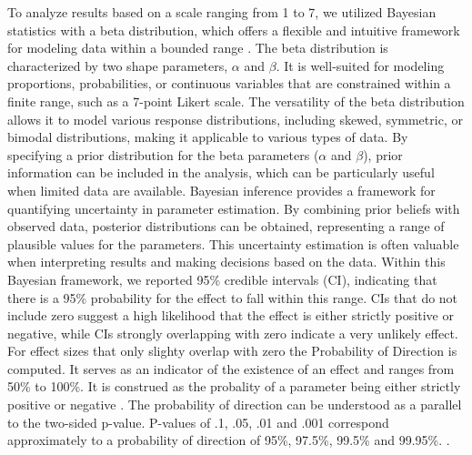 To analyze results based on a scale ranging from 1 to 7, we utilized Bayesian statistics with a beta distribution, which offers a flexible and intuitive framework for modeling data within a bounded range \cite{Paolino2001}. The beta distribution is characterized by two shape parameters, $\alpha$ and $\beta$. It is well-suited for modeling proportions, probabilities, or continuous variables that are constrained within a finite range, such as a 7-point Likert scale. The versatility of the beta distribution allows it to model various response distributions, including skewed, symmetric, or bimodal distributions, making it applicable to various types of data. By specifying a prior distribution for the beta parameters ($\alpha$ and $\beta$), prior information can be included in the analysis, which can be particularly useful when limited data are available. Bayesian inference provides a framework for quantifying uncertainty in parameter estimation. By combining prior beliefs with observed data, posterior distributions can be obtained, representing a range of plausible values for the parameters. This uncertainty estimation is often valuable when interpreting results and making decisions based on the data. Within this Bayesian framework, we reported 95\% credible intervals (CI), indicating that there is a 95\% probability for the effect to fall within this range. CIs that do not include zero suggest a high likelihood that the effect is either strictly positive or negative, while CIs strongly overlapping with zero indicate a very unlikely effect. For effect sizes that only slighty overlap with zero the Probability of Direction is computed. It serves as an indicator of the existence of an effect and ranges from 50\% to 100\%. It is construed as the probality of a parameter being either strictly positive or negative . The probability of direction can be understood as a parallel to the two-sided p-value. P-values of .1, .05, .01 and .001 correspond approximately to a probability of direction of 95\%, 97.5\%, 99.5\% and 99.95\%. \cite{Makowski2019}. 

